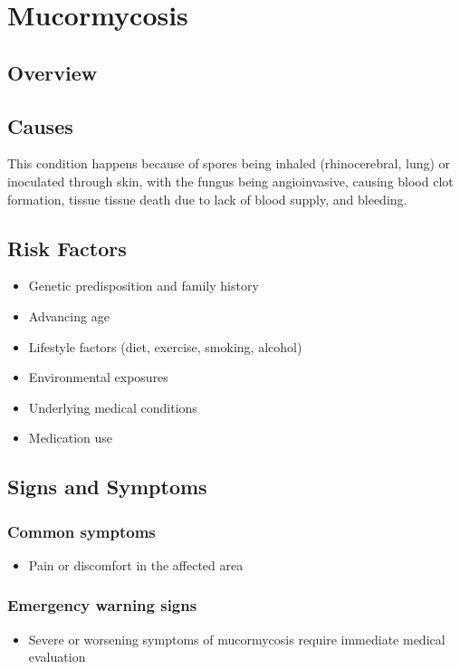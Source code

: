 \chapter{Mucormycosis}
\label{sec:Mucormycosis}

\section{Overview}

\section{Causes}
This condition happens because of spores being inhaled (rhinocerebral, lung) or inoculated through skin, with the fungus being angioinvasive, causing blood clot formation, tissue tissue death due to lack of blood supply, and bleeding.     
\section{Risk Factors}

\begin{itemize}[noitemsep]
  \item Genetic predisposition and family history
  \item Advancing age
  \item Lifestyle factors (diet, exercise, smoking, alcohol)
  \item Environmental exposures
  \item Underlying medical conditions
  \item Medication use
\end{itemize}
\section{Signs and Symptoms}

\subsection{Common symptoms}
\begin{itemize}[noitemsep]
  \item Pain or discomfort in the affected area
  \end{itemize}

\subsection{Emergency warning signs}
\begin{itemize}[noitemsep]
  \item Severe or worsening symptoms of mucormycosis require immediate medical evaluation
\end{itemize}
